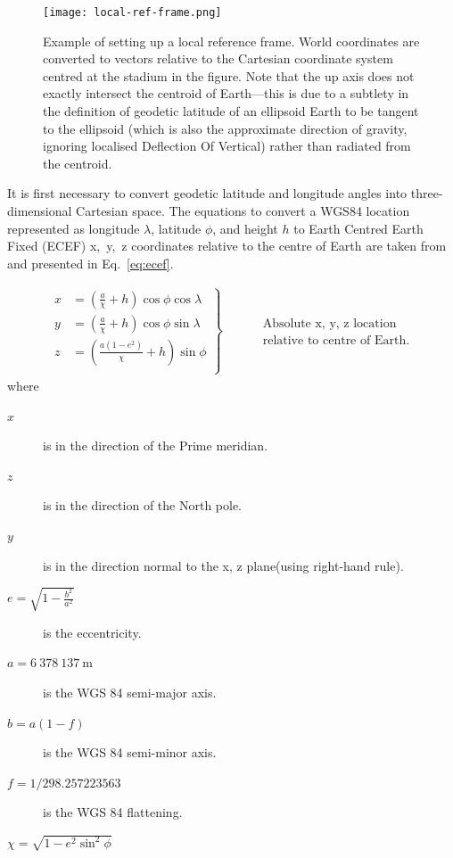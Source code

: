 \begin{figure}[htbp]
  \centering
  \texttt{[image: local-ref-frame.png]}
  \caption{Example of setting up a local reference frame. World coordinates are converted to vectors relative to the Cartesian coordinate system centred at the stadium in the figure. Note that the up axis does not exactly intersect the centroid of Earth---this is due to a subtlety in the definition of geodetic latitude of an ellipsoid Earth to be tangent to the ellipsoid (which is also the approximate direction of gravity, ignoring localised Deflection Of Vertical) rather than radiated from the centroid.}
  \label{fig:local-ref-frame}
\end{figure}

It is first necessary to convert geodetic latitude and longitude angles into
three-dimensional Cartesian space. The equations to convert a WGS84 location
represented as longitude \(\lambda\), latitude \(\phi\), and height
\(h\) to Earth Centred Earth Fixed (ECEF) x,~y,~z coordinates relative to
the centre of Earth are taken from \cite{drake_converting_2002} and presented in Eq.~\ref{eq:ecef}.

\begin{minipage}{\linewidth}
\begin{align} \label{eq:ecef}
\left.\begin{aligned}
      x &= \left(\frac{a}{\chi}+h\right)\cos{\phi}\cos{\lambda} \\
      y &= \left(\frac{a}{\chi}+h\right)\cos{\phi}\sin{\lambda} \\
      z &= \left(\frac{a(1-e^2)}{\chi}+h\right)\sin{\phi} \\
      \end{aligned}
\right\}
\qquad
\begin{aligned}
& \text{Absolute x, y, z location} \\
& \text{relative to centre of Earth.}
\end{aligned}
\end{align}
where
\begin{description}
\item[$x$] is in the direction of the Prime meridian.
\item[$z$] is in the direction of the North pole.
\item[$y$] is in the direction normal to the x, z plane\newline(using right-hand rule).
\item[$e = \sqrt{1-\frac{b^2}{a^2}}$] is the eccentricity.
\item[$a = 6\ 378\ 137\ \mathrm{\mathrm{m}}$] is the WGS 84 semi-major axis.
\item[$b = a\left(1-f\right)$] is the WGS 84 semi-minor axis.
\item[$f = 1/298.257223563$] is the WGS 84 flattening.
\item[$\chi = \sqrt{1-e^2\sin^2{\phi}}$]
\end{description}
\end{minipage}

